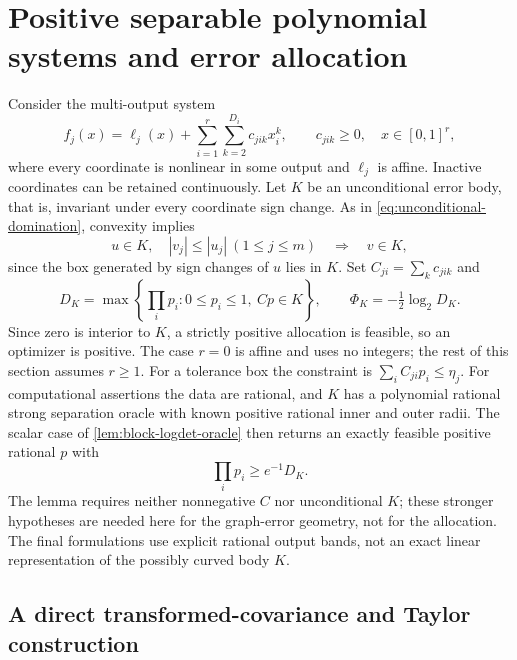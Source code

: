 \section{Positive separable polynomial systems and error allocation}
\label{sec:positive-allocation}

Consider the multi-output system
\begin{equation}\label{eq:positive-polynomial-system}
 f_j(x)=\ell_j(x)+\sum_{i=1}^r\sum_{k=2}^{D_i}c_{jik}x_i^k,
 \qquad c_{jik}\ge0,\quad x\in[0,1]^r,
\end{equation}
where every coordinate is nonlinear in some output and $\ell_j$ is
affine. Inactive coordinates can be retained continuously. Let $K$ be
an unconditional error body, that is, invariant under every coordinate
sign change. As in \eqref{eq:unconditional-domination}, convexity implies
\begin{equation}\label{eq:positive-unconditional-domination}
 u\in K,\quad |v_j|\le|u_j|\ (1\le j\le m)
 \quad\Longrightarrow\quad v\in K,
\end{equation}
since the box generated by sign changes of $u$ lies in $K$.
Set $C_{ji}=\sum_kc_{jik}$ and
\begin{equation}\label{eq:positive-allocation}
 D_K=\max\left\{\prod_ip_i:0\le p_i\le1,\ Cp\in K\right\},
 \qquad \Phi_K=-\tfrac12\log_2D_K.
\end{equation}
Since zero is interior to $K$, a strictly positive allocation is
feasible, so an optimizer is positive. The case $r=0$ is affine and uses
no integers; the rest of this section assumes $r\ge1$.
For a tolerance box the constraint is $\sum_iC_{ji}p_i\le\eta_j$.
For computational assertions the data are rational, and $K$ has a
polynomial rational strong separation oracle with known positive rational
inner and outer radii. The scalar case of
\cref{lem:block-logdet-oracle} then returns an exactly feasible positive
rational $p$ with
\begin{equation}\label{eq:positive-allocation-oracle}
 \prod_ip_i\ge e^{-1}D_K.
\end{equation}
The lemma requires neither nonnegative $C$ nor unconditional $K$; these
stronger hypotheses are needed here for the graph-error geometry, not
for the allocation. The final formulations use explicit rational output bands,
not an exact linear representation of the possibly curved body $K$.

\subsection{A direct transformed-covariance and Taylor construction}

